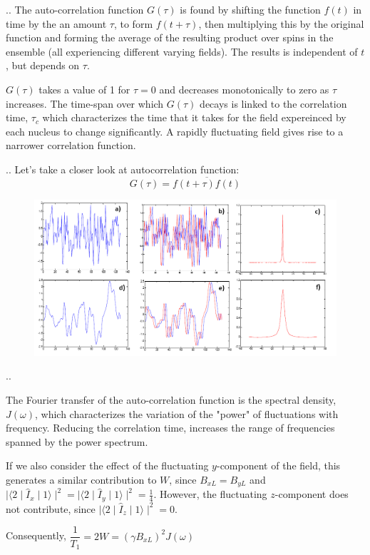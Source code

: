 \documentclass[handout]{beamer}
\begin{document}
\begin{frame}{\thesection.\thesubsection. \insertsubsection}
	The auto-correlation function $G(\tau)$ is found by shifting the function $f(t)$ in time by the an amount $\tau$, to form $f(t + \tau)$, then multiplying this by the original function and forming the average of the resulting product over spins in the ensemble (all experiencing different varying fields). The results is independent of $t$, but depends on $\tau$.
	
	$G(\tau)$ takes a value of 1 for $\tau = 0$ and decreases monotonically to zero as $\tau$ increases. The time-span over which $G(\tau)$ decays is linked to the correlation time, $\tau_c$ which characterizes the time that it takes for the field expereinced by each nucleus to change significantly. A rapidly fluctuating field gives rise to a narrower correlation function. 
\end{frame}		
	

\begin{frame}{\thesection.\thesubsection. \insertsubsection}	
   Let's take a closer look at \alert{autocorrelation function}:
   \begin{equation*}
     G(\tau) = \overline{f(t+ \tau) f(t)}
   \end{equation*}

  \begin{figure}
  	\centering
  	\includegraphics[scale=0.4]{figures/correlation_function.png}
  \end{figure}
\end{frame}

\begin{frame}{\thesection.\thesubsection. \insertsubsection}

	The Fourier transfer of the auto-correlation function is the \alert{spectral density}, $J(\omega)$, which characterizes the variation of the "power" of fluctuations with frequency. Reducing the correlation time, increases the range of frequencies spanned by the power spectrum.
	
	If we also consider the effect of the fluctuating $y$-component of the field, this generates a similar contribution to $W$, since $B_{xL} = B_{yL}$ and $ \mid \langle 2 \mid \hat{I}_x \mid 1 \rangle \mid^2 = \mid \langle 2 \mid \hat{I}_y \mid 1 \rangle \mid^2 = \frac{1}{4}$. However, the fluctuating $z$-component does not contribute, since  $ \mid \langle 2 \mid \hat{I}_z \mid 1 \rangle \mid^2 = 0 $.
	
	Consequently, $\dfrac{1}{T_1} = 2 W = (\gamma B_{xL})^2 J(\omega)$
\end{frame}
\end{document}
